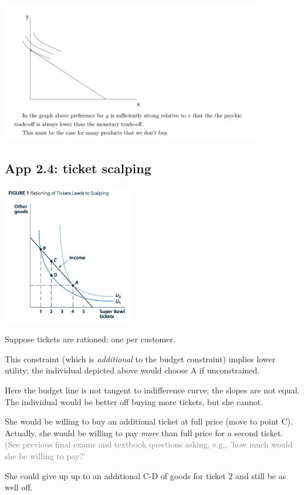 \documentclass[]{article}
\begin{document}
\includegraphics[height=2.4in]{picsfigs/goodwedontbuy.png}

\hypertarget{app-2.4-ticket-scalping}{%
\subsection{App 2.4: ticket scalping}\label{app-2.4-ticket-scalping}}

\includegraphics[height=2.4in]{picsfigs/scalping.png}

Suppose tickets are rationed: one per customer.

This constraint (which is \emph{additional} to the budget constraint)
implies lower utility; the individual depicted above would choose A if
unconstrained.

Here the budget line is not tangent to indifference curve; the slopes
are not equal. The individual would be better off buying more tickets,
but she cannot.

She would be willing to buy an additional ticket at full price (move to
point C). Actually, she would be willing to pay \emph{more} than full
price for a second ticket.
\textcolor{gray}{(See previous final exams and textbook questions asking, e.g., 'how much would she be willing to pay?'}

She could give up up to an additional C-D of goods for ticket 2 and
still be as well off.
\end{document}
